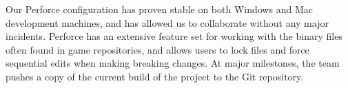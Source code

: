 Our Perforce configuration has proven stable on both Windows and Mac development machines, 
and has allowed us to collaborate without any major incidents. Perforce has an extensive feature 
set for working with the binary files often found in game repositories, and allows users to lock files 
and force sequential edits when making breaking changes. At major milestones, the team pushes a
copy of the current build of the project to the Git repository.\\